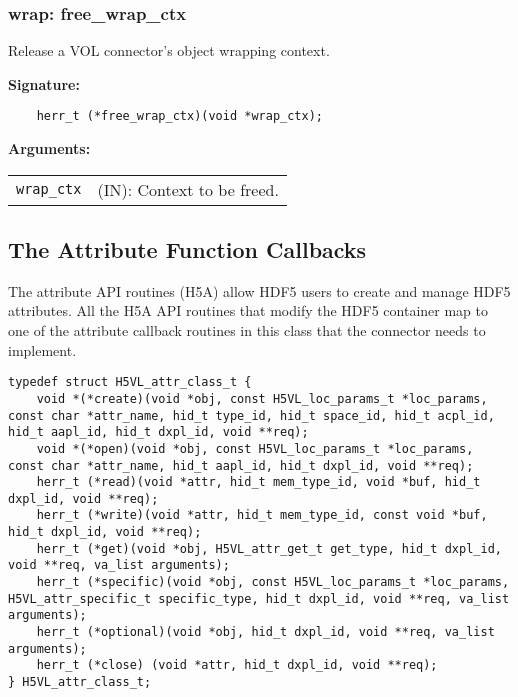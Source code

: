 \subsubsection{wrap: free\_wrap\_ctx}
Release a VOL connector's object wrapping context.

\begin{mdframed}[style=bgbox]
\textbf{Signature:}
\begin{lstlisting}
    herr_t (*free_wrap_ctx)(void *wrap_ctx);
\end{lstlisting}

\textbf{Arguments:}\\
\begin{tabular}{l p{13.5cm}}
  \texttt{wrap\_ctx} & (IN): Context to be freed.\\
\end{tabular}
\end{mdframed}



\subsection{The Attribute Function Callbacks}
The attribute API routines (H5A) allow HDF5 users to create and manage
HDF5 attributes. All the H5A API routines that modify the HDF5
container map to one of the attribute callback routines in this
class that the connector needs to implement.

\begin{lstlisting}[caption={Structure for attribute callback routines, H5VLconnector.h}, captionpos=b, label={lst:ATTRclass}]
typedef struct H5VL_attr_class_t {                                               
    void *(*create)(void *obj, const H5VL_loc_params_t *loc_params, const char *attr_name, hid_t type_id, hid_t space_id, hid_t acpl_id, hid_t aapl_id, hid_t dxpl_id, void **req);
    void *(*open)(void *obj, const H5VL_loc_params_t *loc_params, const char *attr_name, hid_t aapl_id, hid_t dxpl_id, void **req);
    herr_t (*read)(void *attr, hid_t mem_type_id, void *buf, hid_t dxpl_id, void **req);
    herr_t (*write)(void *attr, hid_t mem_type_id, const void *buf, hid_t dxpl_id, void **req);
    herr_t (*get)(void *obj, H5VL_attr_get_t get_type, hid_t dxpl_id, void **req, va_list arguments);
    herr_t (*specific)(void *obj, const H5VL_loc_params_t *loc_params, H5VL_attr_specific_t specific_type, hid_t dxpl_id, void **req, va_list arguments);            
    herr_t (*optional)(void *obj, hid_t dxpl_id, void **req, va_list arguments); 
    herr_t (*close) (void *attr, hid_t dxpl_id, void **req);                     
} H5VL_attr_class_t; 
\end{lstlisting}

